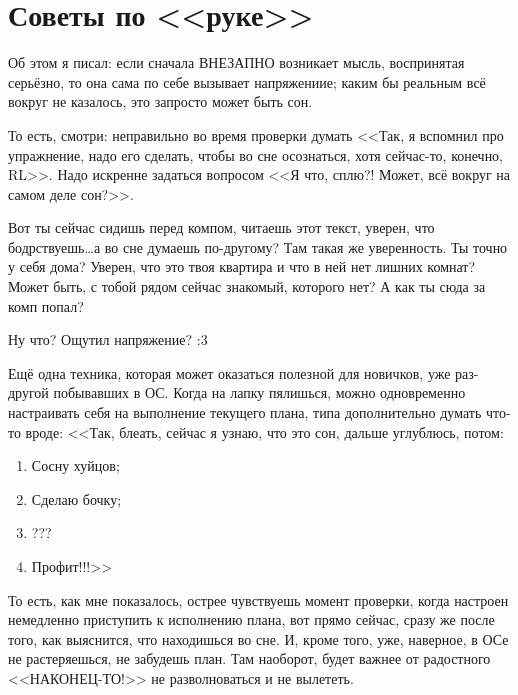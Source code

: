 \documentclass[a5paper,12pt,twoside]{memoir}
\begin{document}
\chapter{Советы по <<руке>>}


\medskip

Об этом я писал: если сначала ВНЕЗАПНО возникает мысль, воспринятая серьёзно, то она сама по себе вызывает напряжениие; каким бы реальным всё вокруг не казалось, это запросто может быть сон.

То есть, смотри: неправильно во время проверки думать <<Так, я вспомнил про упражнение, надо его сделать, чтобы во сне осознаться, хотя сейчас-то, конечно, RL>>. Надо искренне задаться вопросом <<Я что, сплю?! Может, всё вокруг на самом деле сон?>>.

Вот ты сейчас сидишь перед компом, читаешь этот текст, уверен, что бодрствуешь\ldots а во сне думаешь по-другому? Там такая же уверенность. 
Ты точно у себя дома? Уверен, что это твоя квартира и что в ней нет лишних комнат? Может быть, с тобой рядом сейчас знакомый, которого нет? А как ты сюда за комп попал? 

Ну что? Ощутил напряжение? :3

Ещё одна техника, которая может оказаться полезной для новичков, уже раз-другой побывавших в ОС. Когда на лапку пялишься, можно одновременно настраивать себя на выполнение текущего плана, типа дополнительно думать что-то вроде: <<Так, блеать, сейчас я узнаю, что это сон, дальше углублюсь, потом:
\begin{enumerate}
\item Сосну хуйцов;
\item Сделаю бочку;
\item ???
\item Профит!!!>>
\end{enumerate}

То есть, как мне показалось, острее чувствуешь момент проверки, когда настроен немедленно приступить к исполнению плана, вот прямо сейчас, сразу же после того, как выяснится, что находишься во сне. И, кроме того, уже, наверное, в ОСе не растеряешься, не забудешь план. Там наоборот, будет важнее от радостного <<НАКОНЕЦ-ТО!>> не разволноваться и не вылететь.
\end{document}
